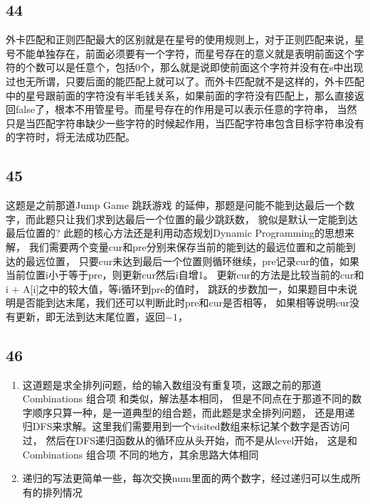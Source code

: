 \documentclass[12pt,a4paper]{article}
\begin{document}
\subsection{44}
\begin{CJK}{UTF8}{gbsn}
外卡匹配和正则匹配最大的区别就是在星号的使用规则上，对于正则匹配来说，星号不能单独存在，前面必须要有一个字符，而星号存在的意义就是表明前面这个字符的个数可以是任意个，包括0个，那么就是说即使前面这个字符并没有在s中出现过也无所谓，只要后面的能匹配上就可以了。而外卡匹配就不是这样的，外卡匹配中的星号跟前面的字符没有半毛钱关系，如果前面的字符没有匹配上，那么直接返回false了，根本不用管星号。而星号存在的作用是可以表示任意的字符串，
当然只是当匹配字符串缺少一些字符的时候起作用，当匹配字符串包含目标字符串没有的字符时，将无法成功匹配。
\end{CJK}
\subsection{45}
\begin{CJK}{UTF8}{gbsn}
这题是之前那道Jump Game 跳跃游戏 的延伸，那题是问能不能到达最后一个数字，而此题只让我们求到达最后一个位置的最少跳跃数，
貌似是默认一定能到达最后位置的? 此题的核心方法还是利用动态规划Dynamic Programming的思想来解，
我们需要两个变量cur和pre分别来保存当前的能到达的最远位置和之前能到达的最远位置，
只要cur未达到最后一个位置则循环继续，pre记录cur的值，如果当前位置i小于等于pre，则更新cur然后i自增1。
更新cur的方法是比较当前的cur和i + A[i]之中的较大值，等i循环到pre的值时，
跳跃的步数加一，如果题目中未说明是否能到达末尾，我们还可以判断此时pre和cur是否相等，
如果相等说明cur没有更新，即无法到达末尾位置，返回$-1$，
\end{CJK}

\subsection{46}
\begin{enumerate}
\item
\begin{CJK}{UTF8}{gbsn}
这道题是求全排列问题，给的输入数组没有重复项，这跟之前的那道 Combinations 组合项 和类似，解法基本相同，
但是不同点在于那道不同的数字顺序只算一种，是一道典型的组合题，而此题是求全排列问题，
还是用递归DFS来求解。这里我们需要用到一个visited数组来标记某个数字是否访问过，
然后在DFS递归函数从的循环应从头开始，而不是从level开始，
这是和 Combinations 组合项 不同的地方，其余思路大体相同
\end{CJK}
\item
\begin{CJK}{UTF8}{gbsn}
递归的写法更简单一些，每次交换num里面的两个数字，经过递归可以生成所有的排列情况
\end{CJK}
\end{enumerate}
\end{document}
